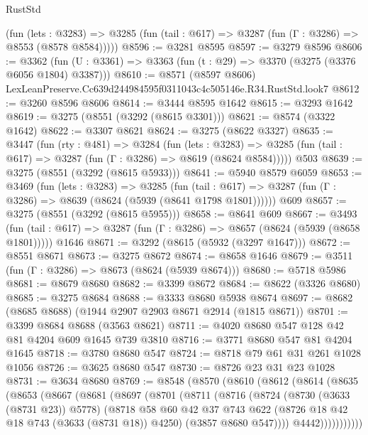 \begin{lexlean}{RustStd}
\begin{coremodule}
      (fun (lets : @3283) =>
      @3285 (fun (tail : @617) => @3287 (fun (Γ : @3286) => @8553 (@8578 @8584)))))
@8596 := @3281 @8595
@8597 := @3279 @8596
@8606 := @3362 (fun (U : @3361) => @3363 (fun (t : @29) => @3370 (@3275 (@3376 @6056 @1804) @3387)))
@8610 := @8571 (@8597 @8606) LexLeanPreserve.Cc639d244984595f0311043c4c505146e.R34.RustStd.look7
@8612 := @3260 @8596 @8606
@8614 := @3444 @8595 @1642
@8615 := @3293 @1642
@8619 := @3275 (@8551 (@3292 (@8615 @3301)))
@8621 := @8574 (@3322 @1642)
@8622 := @3307 @8621
@8624 := @3275 (@8622 @3327)
@8635 := @3447
    (fun (rty : @481) =>
    @3284
      (fun (lets : @3283) =>
      @3285 (fun (tail : @617) => @3287 (fun (Γ : @3286) => @8619 (@8624 @8584)))))
    @503
@8639 := @3275 (@8551 (@3292 (@8615 @5933)))
@8641 := @5940 @8579 @6059
@8653 := @3469
    (fun (lets : @3283) =>
    @3285
      (fun (tail : @617) => @3287 (fun (Γ : @3286) => @8639 (@8624 (@5939 (@8641 @1798 @1801))))))
    @609
@8657 := @3275 (@8551 (@3292 (@8615 @5955)))
@8658 := @8641 @609
@8667 := @3493
    (fun (tail : @617) => @3287 (fun (Γ : @3286) => @8657 (@8624 (@5939 (@8658 @1801)))))
    @1646
@8671 := @3292 (@8615 (@5932 (@3297 @1647)))
@8672 := @8551 @8671
@8673 := @3275 @8672
@8674 := @8658 @1646
@8679 := @3511 (fun (Γ : @3286) => @8673 (@8624 (@5939 @8674)))
@8680 := @5718 @5986
@8681 := @8679 @8680
@8682 := @3399 @8672
@8684 := @8622 (@3326 @8680)
@8685 := @3275 @8684
@8688 := @3333 @8680 @5938 @8674
@8697 := @8682 (@8685 @8688) (@1944 @2907 @2903 @8671 @2914 (@1815 @8671))
@8701 := @3399 @8684 @8688 (@3563 @8621)
@8711 := @4020 @8680 @547 @128 @42 @81 @4204 @609 @1645 @739 @3810
@8716 := @3771 @8680 @547 @81 @4204 @1645
@8718 := @3780 @8680 @547
@8724 := @8718 @79 @61 @31 @261 @1028 @1056
@8726 := @3625 @8680 @547
@8730 := @8726 @23 @31 @23 @1028
@8731 := @3634 @8680
@8769 := @8548
    (@8570
      (@8610
        (@8612
          (@8614
            (@8635
              (@8653
                (@8667
                  (@8681
                    (@8697
                      (@8701
                        (@8711
                          (@8716
                            (@8724
                              (@8730 (@3633 (@8731 @23)) @5778)
                              (@8718
                                @58
                                @60
                                @42
                                @37
                                @743
                                @622
                                (@8726 @18 @42 @18 @743 (@3633 (@8731 @18)) @4250)
                                (@3857 @8680 @547))))
                          @4442)))))))))))

\end{coremodule}
\end{lexlean}
